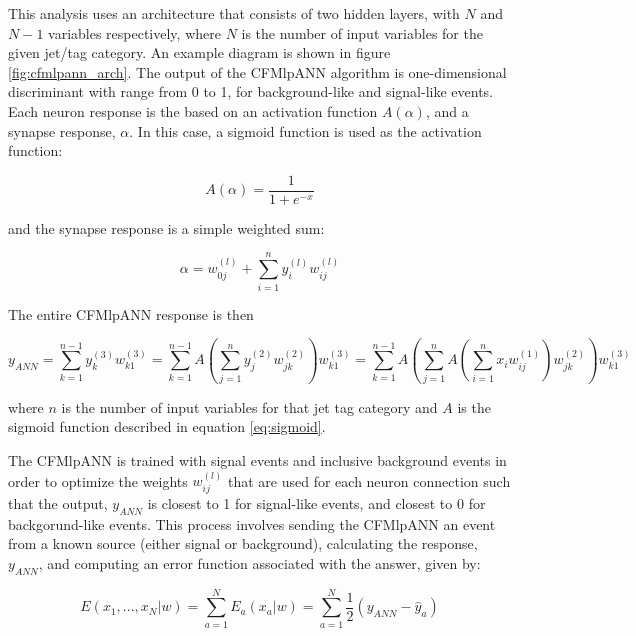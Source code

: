 \par This analysis uses an architecture that consists of two hidden
layers, with $N$ and $N-1$ variables respectively, where $N$ is the
number of input variables for the given jet/tag category.  An example
diagram is shown in figure \ref{fig:cfmlpann_arch}.  The output of the
CFMlpANN algorithm is one-dimensional discriminant with range from 0
to 1, for background-like and signal-like events.  Each neuron
response is the based on an activation function $A(\alpha)$, and a synapse
response, $\alpha$.  In this case, a sigmoid function is used as
the activation function:

\begin{equation}\label{eq:sigmoid}
A(\alpha) = \frac{1}{1+e^{-x}}
\end{equation}

\noindent and the synapse response is a simple weighted sum:

\begin{equation}\label{eq:ann_synapse}
\alpha = w_{0j}^{(l)} + \sum_{i=1}^{n}y_{i}^{(l)}w_{ij}^{(l)} 
\end{equation}

\noindent The entire CFMlpANN response is then 

\begin{equation}\label{eq:ann_output}
y_{ANN} = \sum_{k=1}^{n-1}y_{k}^{(3)}w_{k1}^{(3)} = \sum_{k=1}^{n-1}A\left(
\sum_{j=1}^{n}y_{j}^{(2)}w_{jk}^{(2)}\right)w_{k1}^{(3)} = \sum_{k=1}^{n-1}A\left(
\sum_{j=1}^{n}A\left(\sum_{i=1}^{n}x_{i}w_{ij}^{(1)}\right)w_{jk}^{(2)}\right)w_{k1}^{(3)}
\end{equation}
 
\noindent where $n$ is the number of input variables for that jet tag
category and $A$ is the sigmoid function described in equation
\ref{eq:sigmoid}.  

\par The CFMlpANN is trained with \ttH signal events and inclusive
\ttjets background events in order to optimize the weights
$w_{ij}^{(l)}$ that are used for each neuron connection such that the
output, $y_{ANN}$ is closest to 1 for signal-like events, and closest
to 0 for backgorund-like events.  This process involves sending the
CFMlpANN an event from a known source (either signal or background),
calculating the response, $y_{ANN}$, and computing an error function
associated with the answer, given by:

\begin{equation}\label{eq:ann_err}
E(x_{1},...,x_{N}|w) = \sum_{a=1}^{N}E_{a}(x_{a}|w) =
\sum_{a=1}^{N}\frac{1}{2}(y_{ANN} - \hat{y}_{a})
\end{equation}


